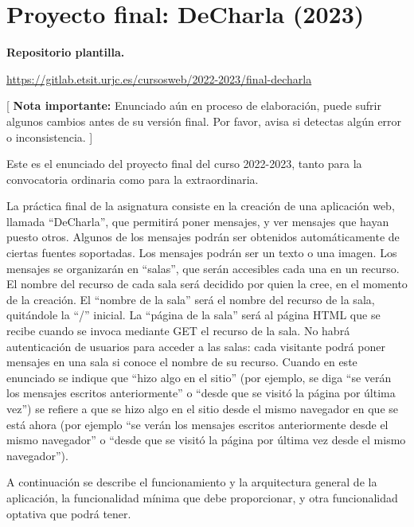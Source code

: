 \section{Proyecto final: DeCharla (2023)}
\label{practica-final-2023-05}

\textbf{Repositorio plantilla.}

\url{https://gitlab.etsit.urjc.es/cursosweb/2022-2023/final-decharla}

[ \textbf{Nota importante:} Enunciado aún en proceso de elaboración, puede sufrir algunos cambios antes de su versión final. Por favor, avisa si detectas algún error o inconsistencia. ]


Este es el enunciado del proyecto final del curso 2022-2023, tanto para la convocatoria ordinaria como para la extraordinaria.

La práctica final de la asignatura consiste en la creación de una aplicación web, llamada ``DeCharla'', que permitirá poner mensajes, y ver mensajes que hayan puesto otros. Algunos de los mensajes podrán ser obtenidos automáticamente de ciertas fuentes soportadas. Los mensajes podrán ser un texto o una imagen. Los mensajes se organizarán en ``salas'', que serán accesibles cada una en un recurso. El nombre del recurso de cada sala será decidido por quien la cree, en el momento de la creación. El ``nombre de la sala'' será el nombre del recurso de la sala, quitándole la ``/'' inicial. La ``página de la sala'' será al página HTML que se recibe cuando se invoca mediante GET el recurso de la sala. No habrá autenticación de usuarios para acceder a las salas: cada visitante podrá poner mensajes en una sala si conoce el nombre de su recurso. Cuando en este enunciado se indique que ``hizo algo en el sitio'' (por ejemplo, se diga ``se verán los mensajes escritos anteriormente'' o ``desde que se visitó la página por última vez'') se refiere a que se hizo algo en el sitio desde el mismo navegador en que se está ahora (por ejemplo ``se verán los mensajes escritos anteriormente desde el mismo navegador'' o ``desde que se visitó la página por última vez desde el mismo navegador'').

A continuación se describe el funcionamiento y la arquitectura general de la aplicación, la funcionalidad mínima que debe proporcionar, y otra funcionalidad optativa que podrá tener.

